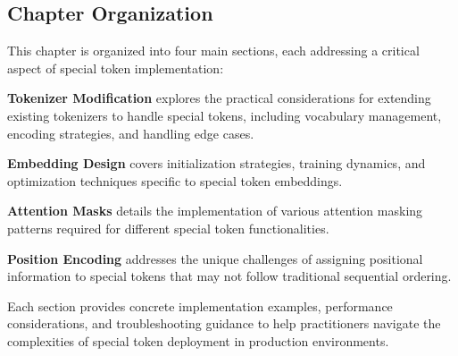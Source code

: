 \subsection{Chapter Organization}

This chapter is organized into four main sections, each addressing a critical aspect of special token implementation:

\textbf{Tokenizer Modification} explores the practical considerations for extending existing tokenizers to handle special tokens, including vocabulary management, encoding strategies, and handling edge cases.

\textbf{Embedding Design} covers initialization strategies, training dynamics, and optimization techniques specific to special token embeddings.

\textbf{Attention Masks} details the implementation of various attention masking patterns required for different special token functionalities.

\textbf{Position Encoding} addresses the unique challenges of assigning positional information to special tokens that may not follow traditional sequential ordering.

Each section provides concrete implementation examples, performance considerations, and troubleshooting guidance to help practitioners navigate the complexities of special token deployment in production environments.